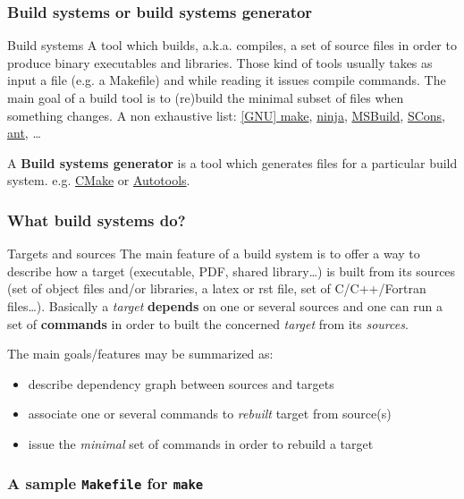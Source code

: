 \documentclass[compress,slidestop,table,usepdftitle=false
              ]
               {beamer}
\begin{document}
\begin{frame}[fragile]
\frametitle{Build systems or build systems generator}
\begin{block}{Build systems}
A tool which builds, a.k.a. compiles, a set of source files in order to produce binary executables and libraries.
Those kind of tools usually takes as input a file (e.g. a Makefile) and while reading it issues compile commands.
The main goal of a build tool is to (re)build the minimal subset of files when something changes.
A non exhaustive list: \href{https://www.gnu.org/software/make/}{[GNU] make}, \href{https://ninja-build.org/}{ninja}, \href{https://github.com/Microsoft/msbuild}{MSBuild}, \href{http://www.scons.org}{SCons}, \href{http://ant.apache.org/}{ant}, \ldots
\end{block}
A \textbf{Build systems generator} is a tool which generates files for a particular build system. e.g. \href{http://cmake.org}{CMake} or \href{http://www.gnu.org/software/autoconf/}{Autotools}.
\end{frame}

\begin{frame}
  \frametitle{What build systems do?}
  \begin{block}{Targets and sources}
    The main feature of a build system is to offer a way to describe how a target (executable, PDF, shared library\ldots) is built from its sources (set of object files and/or libraries, a latex or rst file, set of C/C++/Fortran files\ldots). Basically a \emph{target} \textbf{depends} on one or several {sources} and one can run a set of \textbf{commands} in order to built the concerned \emph{target} from its \emph{sources}. 
  \end{block}
  The main goals/features may be summarized as:
  \begin{itemize}
  \item describe dependency graph between sources and targets
  \item associate one or several commands to \emph{rebuilt} target from source(s)
  \item issue the \emph{minimal} set of commands in order to rebuild a target
  \end{itemize}
\end{frame}

\begin{frame}[label=samplemakefile,fragile]
  \frametitle{A sample \texttt{Makefile} for \texttt{make}}

\end{frame}
\end{document}
